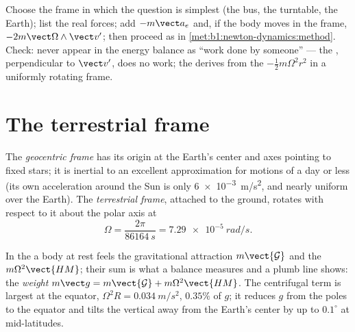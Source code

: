 \begin{method}\label{met:b1:non-inertial-frames:method}
Choose the frame in which the question is simplest (the bus, the
turntable, the Earth); list the real forces; add $-m\vect a_e$ and, if the
body moves in the frame, $-2m\vect\Omega\wedge\vect v'$; then proceed as in
\cref{met:b1:newton-dynamics:method}. Check:  never
appear in the energy balance as ``work done by someone'' --- the , perpendicular to $\vect v'$, does no work; the 
derives from the  $-\tfrac12 m\Omega^2r^2$ in a uniformly
rotating frame.
\end{method}

\section{The terrestrial frame}

\begin{definition}\label{def:b1:non-inertial-frames:earth}
The \emph{geocentric frame} has its origin at the Earth's center and
axes pointing to fixed stars; it is inertial to an excellent
approximation for motions of a day or less (its own acceleration around
the Sun is only \qty{6e-3}{m/s^2}, and nearly uniform over the Earth).
The \emph{terrestrial frame}, attached to the ground, rotates with
respect to it about the polar axis at
\[
\Omega = \frac{2\pi}{\qty{86164}{s}} = \qty{7.29e-5}{rad/s} .
\]
\end{definition}

\begin{proposition}\label{prop:b1:non-inertial-frames:weight}
In the  a body at rest feels the gravitational
attraction $m\vect{\mathcal G}$ and the  $m\Omega^2\vect{HM}$; their
sum is what a balance measures and a plumb line shows: the \emph{weight}
$m\vect g = m\vect{\mathcal G} + m\Omega^2\vect{HM}$. The centrifugal term is largest
at the equator, $\Omega^2R = \qty{0.034}{m/s^2}$, $0.35\%$ of $g$; it
reduces $g$ from the poles to the equator and tilts the vertical away
from the Earth's center by up to $0.1^\circ$ at mid-latitudes.
\end{proposition}

